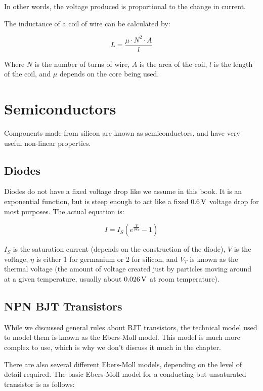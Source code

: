In other words, the voltage produced is proportional to the change in current.

The inductance of a coil of wire can be calculated by:

\begin{equation}
L = \frac{\mu \cdot N^2 \cdot A}{l}
\end{equation}

Where $N$ is the number of turns of wire, $A$ is the area of the coil, $l$ is the length of the coil, and $\mu$ depends on the core being used.

\section{Semiconductors}

Components made from silicon are known as semiconductors, and have very useful non-linear properties.

\subsection{Diodes}

Diodes do not have a fixed voltage drop like we assume in this book.  
It is an exponential function, but is steep enough to act like a fixed $0.6\,\si{\volt}$ voltage drop for most purposes.
The actual equation is:

\begin{equation}
I = I_S (e^{\frac{V}{\eta V_T}} - 1)
\end{equation}

$I_S$ is the saturation current (depends on the construction of the diode), $V$ is the voltage, $\eta$ is either 1 for germanium or 2 for silicon, and $V_T$ is known as the thermal voltage (the amount of voltage created just by particles moving around at a given temperature, usually about $0.026\,\si{\volt}$ at room temperature).

\subsection{NPN BJT Transistors}

While we discussed general rules about BJT transistors, the technical model used to model them is known as the Ebers-Moll model.
This model is much more complex to use, which is why we don't discuss it much in the chapter.

There are also several different Ebers-Moll models, depending on the level of detail required.
The basic Ebers-Moll model for a conducting but unsaturated transistor is as follows:

